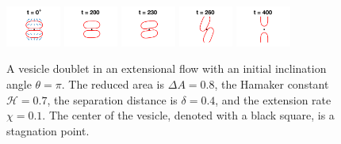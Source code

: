 \documentclass[prf,superscriptaddress,showkeys,longbibliography]{revtex4-1}
\begin{document}
 \begin{figure}
    \includegraphics[width = 0.16\textwidth,trim={4cm 2cm 4cm 1cm},clip]{figs/extensional_adR4em1adS7em1Chi1em1_ra080_image01.png}
  \includegraphics[width = 0.16\textwidth,trim={4cm 2cm 4cm 1cm},clip]{figs/extensional_adR4em1adS7em1Chi1em1_ra080_image02.png}
  \includegraphics[width = 0.16\textwidth,trim={4cm 2cm 4cm 1cm},clip]{figs/extensional_adR4em1adS7em1Chi1em1_ra080_image03.png}
  \includegraphics[width = 0.16\textwidth,trim={4cm 2cm 4cm 1cm},clip]{figs/extensional_adR4em1adS7em1Chi1em1_ra080_image04.png}
  \includegraphics[width = 0.16\textwidth,trim={4cm 2cm 4cm 1cm},clip]{figs/extensional_adR4em1adS7em1Chi1em1_ra080_image05.png}
  \caption{\label{fig:extensional3} A vesicle doublet in an extensional
  flow with an initial inclination angle $\theta=\pi$.  The reduced area
  is $\Delta A = 0.8$, the Hamaker constant $\mathcal{H} = 0.7$, the
  separation distance is $\delta = 0.4$, and the extension rate $\chi
  = 0.1$.  The center of the vesicle, denoted with a black square, is a
  stagnation point.}
\end{figure}
\end{document}
